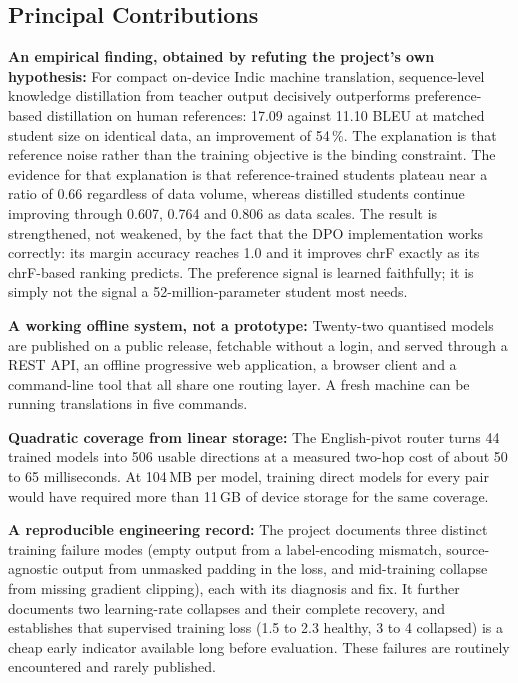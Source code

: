 \subsection{Principal Contributions}
\label{subsec:contributions}

\textbf{An empirical finding, obtained by refuting the project's own
hypothesis:} For compact on-device Indic machine translation, sequence-level
knowledge distillation from teacher output decisively outperforms
preference-based distillation on human references: 17.09 against 11.10 BLEU at
matched student size on identical data, an improvement of 54\,\%. The
explanation is that reference noise rather than the training objective is the
binding constraint. The evidence for that explanation is that reference-trained
students plateau near a ratio of 0.66 regardless of data volume, whereas
distilled students continue improving through 0.607, 0.764 and 0.806 as data
scales. The result is strengthened, not weakened, by the fact that the DPO
implementation works correctly: its margin accuracy reaches 1.0 and it improves
chrF exactly as its chrF-based ranking predicts. The preference signal is
learned faithfully; it is simply not the signal a 52-million-parameter student
most needs.

\textbf{A working offline system, not a prototype:} Twenty-two quantised models
are published on a public release, fetchable without a login, and served through
a REST API, an offline progressive web application, a browser client and a
command-line tool that all share one routing layer. A fresh machine can be
running translations in five commands.

\textbf{Quadratic coverage from linear storage:} The English-pivot router turns
44 trained models into 506 usable directions at a measured two-hop cost of about
50 to 65 milliseconds. At 104\,MB per model, training direct models for every
pair would have required more than 11\,GB of device storage for the same
coverage.

\textbf{A reproducible engineering record:} The project documents three distinct
training failure modes (empty output from a label-encoding mismatch,
source-agnostic output from unmasked padding in the loss, and mid-training
collapse from missing gradient clipping), each with its diagnosis and fix. It
further documents two learning-rate collapses and their complete recovery, and
establishes that supervised training loss (1.5 to 2.3 healthy, 3 to 4 collapsed)
is a cheap early indicator available long before evaluation. These failures are
routinely encountered and rarely published.

